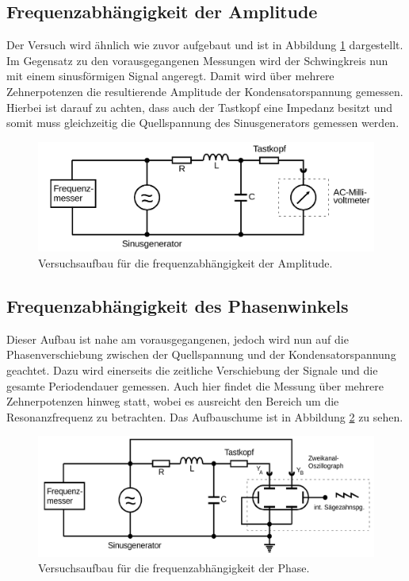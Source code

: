 \subsection{Frequenzabhängigkeit der Amplitude}
Der Versuch wird ähnlich wie zuvor aufgebaut und ist in Abbildung \ref{fig:aufbau3} dargestellt.
Im Gegensatz zu den vorausgegangenen Messungen wird der Schwingkreis nun mit einem sinusförmigen Signal angeregt.
Damit wird über mehrere Zehnerpotenzen die resultierende Amplitude der Kondensatorspannung gemessen.
Hierbei ist darauf zu achten, dass auch der Tastkopf eine Impedanz besitzt und somit muss gleichzeitig die Quellspannung des Sinusgenerators gemessen werden.
\begin{figure}[H]
    \centering
    \caption{Versuchsaufbau für die frequenzabhängigkeit der Amplitude.\cite{v354}}
    \label{fig:aufbau3}
    \includegraphics[width=\textwidth]{content/aufbau3.png}
\end{figure}
%
\subsection{Frequenzabhängigkeit des Phasenwinkels}
Dieser Aufbau ist nahe am vorausgegangenen, jedoch wird nun auf die Phasenverschiebung zwischen der Quellspannung und der Kondensatorspannung geachtet.
Dazu wird einerseits die zeitliche Verschiebung der Signale und die gesamte Periodendauer gemessen.
Auch hier findet die Messung über mehrere Zehnerpotenzen hinweg statt, 
wobei es ausreicht den Bereich um die Resonanzfrequenz zu betrachten.
Das Aufbauschume ist in Abbildung \ref{fig:aufbau4} zu sehen.
\begin{figure}[H]
    \centering
    \caption{Versuchsaufbau für die frequenzabhängigkeit der Phase.\cite{v354}}
    \label{fig:aufbau4}
    \includegraphics[width=\textwidth]{content/aufbau4.png}
\end{figure}
%

